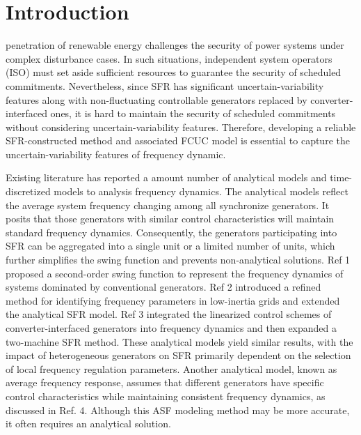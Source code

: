 \documentclass[lettersize,journal]{IEEEtran}
\begin{document}
\section{Introduction}
 penetration of renewable energy challenges the security of power systems under complex disturbance cases. In such situations, independent system operators (ISO) must set
aside sufficient resources to guarantee the security of scheduled commitments. Nevertheless, since SFR has significant uncertain-variability features along with non-fluctuating controllable generators
replaced by converter-interfaced ones, it is hard to maintain the security of scheduled commitments without considering uncertain-variability features. Therefore, developing a reliable SFR-constructed
method and associated FCUC model is essential to capture the uncertain-variability features of frequency dynamic.

Existing literature has reported a amount number of analytical models and time-discretized models to analysis frequency dynamics. The analytical models reflect the average system frequency changing
among all synchronize generators. It posits that those generators with similar control characteristics will maintain standard frequency dynamics.  Consequently, the generators participating into SFR can be aggregated into a single unit or a limited number of units, which further simplifies the swing function and prevents non-analytical solutions. Ref 1 proposed a second-order swing function to represent the frequency dynamics of systems dominated by conventional generators. Ref 2 introduced a refined method for identifying frequency parameters in low-inertia grids and extended the analytical SFR model. Ref 3 integrated the linearized control schemes of converter-interfaced generators into frequency dynamics and then expanded a two-machine SFR method. These analytical models yield similar results, with the impact of heterogeneous generators on SFR primarily dependent on the selection of local frequency regulation parameters. Another analytical model, known as average frequency response, assumes that different generators have specific control characteristics while maintaining consistent frequency dynamics, as discussed in Ref. 4. Although this ASF modeling method may be more accurate, it often requires an analytical solution.
\end{document}

